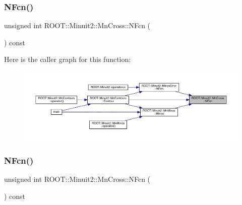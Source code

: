 \mbox{\label{classROOT_1_1Minuit2_1_1MnCross_a52cc0559ea27a2d8fe3f9961670e1544}} 
\subsubsection{\texorpdfstring{NFcn()}{NFcn()}\hspace{0.1cm}{\footnotesize\ttfamily [1/2]}}
{\footnotesize\ttfamily unsigned int R\+O\+O\+T\+::\+Minuit2\+::\+Mn\+Cross\+::\+N\+Fcn (\begin{DoxyParamCaption}{ }\end{DoxyParamCaption}) const\hspace{0.3cm}{\ttfamily [inline]}}

Here is the caller graph for this function\+:\nopagebreak
\begin{figure}[H]
\begin{center}
\leavevmode
\includegraphics[width=350pt]{d3/db2/classROOT_1_1Minuit2_1_1MnCross_a52cc0559ea27a2d8fe3f9961670e1544_icgraph}
\end{center}
\end{figure}
\mbox{\label{classROOT_1_1Minuit2_1_1MnCross_a52cc0559ea27a2d8fe3f9961670e1544}} 
\subsubsection{\texorpdfstring{NFcn()}{NFcn()}\hspace{0.1cm}{\footnotesize\ttfamily [2/2]}}
{\footnotesize\ttfamily unsigned int R\+O\+O\+T\+::\+Minuit2\+::\+Mn\+Cross\+::\+N\+Fcn (\begin{DoxyParamCaption}{ }\end{DoxyParamCaption}) const\hspace{0.3cm}{\ttfamily [inline]}}

